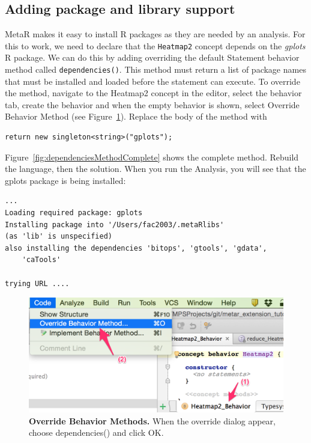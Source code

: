 \subsection{Adding package and library support}
MetaR makes it easy to install R packages as they are needed by an analysis. For this to work, we need to declare that the \texttt{Heatmap2} concept depends on the \textit{gplots} R package.  We can do this by adding overriding the default Statement behavior method called \texttt{dependencies()}. This method must return a list of package names that must be installed and loaded before the statement can execute. To override the method, navigate to the Heatmap2 concept in the editor, select the behavior tab, create the behavior and when the empty behavior is shown, select Override Behavior Method (see Figure~\ref{fig:CreateBehaviorAndOverride}).
Replace the body of the method with 
\begin{lstlisting}
return new singleton<string>("gplots");
\end{lstlisting}
Figure~\ref{fig:dependenciesMethodComplete} shows the complete  method. Rebuild the language, then the solution. When you run the Analysis, you will see that the gplots package is being installed:
\begin{lstlisting}
...
Loading required package: gplots
Installing package into '/Users/fac2003/.metaRlibs'
(as 'lib' is unspecified)
also installing the dependencies 'bitops', 'gtools', 'gdata', 
    'caTools'

trying URL ....
\end{lstlisting}

\begin{figure}
  \centering
  \includegraphics[width=\figWidthNarrow]{figures/CreateBehaviorAndOverride.png}
\caption[Override Behavior Methods.]{\textbf{Override Behavior Methods.} When the override dialog appear, choose dependencies() and click OK.}
\label{fig:CreateBehaviorAndOverride}
\end{figure}


